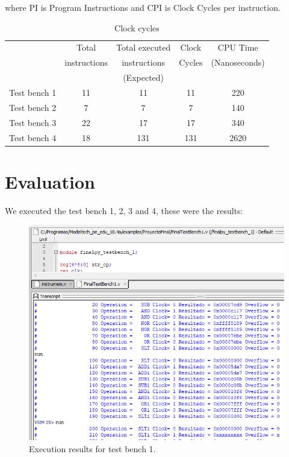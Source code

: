 \documentclass[conference]{IEEEtran}
\begin{document}
where PI is Program Instructions and CPI is Clock Cycles per instruction. 

\begin{table}[h]
\caption{Clock cycles} %
\begin{center}
\begin{tabular}{|c|c|c|c|c|}
\hline
&Total&Total executed&Clock&CPU Time\\
&instructions&instructions&Cycles&(Nanoseconds)\\
&&(Expected)&&\\
\hline
Test bench 1&11&11&11&220\\
\hline
Test bench 2&7&7&7&140\\
\hline
Test bench 3&22&17&17&340\\
\hline
Test bench 4&18&131&131&2620\\
\hline
\end{tabular}
\label{tab_test3}
\end{center}
\end{table}

\section{Evaluation}
We executed the test bench 1, 2, 3 and 4, these were the results:

\begin{figure}[h]
\includegraphics[scale=0.41]{ModelSim_testbench1_clock_cycles.png}
\caption{Execution results for test bench 1.}
\label{result1}
\end{figure}
\end{document}
